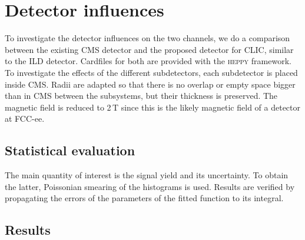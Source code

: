 \section{Detector influences}

To investigate the detector influences on the two channels, we do a comparison between the existing CMS detector and the proposed detector for CLIC, similar to the ILD detector. Cardfiles for both are provided with the \textsc{heppy} framework.
To investigate the effects of the different subdetectors, each subdetector is placed inside CMS. Radii are adapted so that there is no overlap or empty space bigger than in CMS between the subsystems, but their thickness is preserved. The magnetic field is reduced to 2\,T since this is the likely magnetic field of a detector at FCC-ee.

\subsection{Statistical evaluation}
The main quantity of interest is the signal yield and its uncertainty. To obtain the latter, Poissonian smearing of the histograms is used. Results are verified by propagating the errors of the parameters of the fitted function to its integral.

\subsection{Results}
